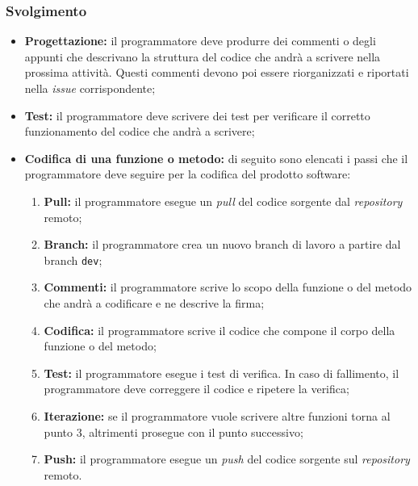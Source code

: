 \subsubsection{Svolgimento}
\begin{itemize}
	\item \textbf{Progettazione:} il programmatore deve produrre dei commenti o
	      degli appunti che descrivano la struttura del codice che andrà a
	      scrivere nella prossima attività. Questi commenti devono poi essere
	      riorganizzati e riportati nella \textit{issue} corrispondente;

	\item \textbf{Test:} il programmatore deve scrivere dei test per verificare
	      il corretto funzionamento del codice che andrà a scrivere;

	\item \textbf{Codifica di una funzione o metodo:} di seguito sono elencati i
	      passi che il programmatore deve seguire per la codifica del prodotto
	      software:
	      \begin{enumerate}
		      \item \textbf{Pull:} il programmatore esegue un \textit{pull} del
		            codice sorgente dal \textit{repository} remoto;

		      \item \textbf{Branch:} il programmatore crea un nuovo branch di
		            lavoro a partire dal branch \texttt{dev};

		      \item \textbf{Commenti:} il programmatore scrive lo scopo della
		            funzione o del metodo che andrà a codificare e ne descrive
		            la firma;

		      \item \textbf{Codifica:} il programmatore scrive il codice che
		            compone il corpo della funzione o del metodo;

		      \item \textbf{Test:} il programmatore esegue i test di verifica.
		            In caso di fallimento, il programmatore deve correggere il
		            codice e ripetere la verifica;

		      \item \textbf{Iterazione:} se il programmatore vuole scrivere
		            altre funzioni torna al punto 3, altrimenti prosegue
		            con il punto successivo;

		      \item \textbf{Push:} il programmatore esegue un \textit{push}
		            del codice sorgente sul \textit{repository} remoto.


\end{enumerate}
\end{itemize}
